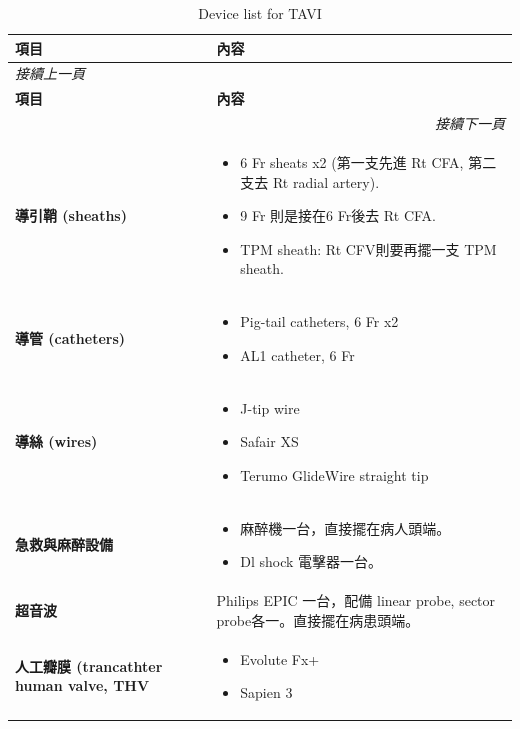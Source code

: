 \documentclass[nols]{tufte-book}
\begin{document}
\begin{longtable}{p{4cm} p{9cm}}
\caption{Device list for TAVI}\\
\hline
\textbf{項目} & \textbf{內容} \\
\hline
\endfirsthead
\multicolumn{2}{l}{\textit{接續上一頁}} \\
\hline
\textbf{項目} & \textbf{內容} \\
\hline
\endhead
\hline \multicolumn{2}{r}{\textit{接續下一頁}} \\
\endfoot
\endlastfoot

\textbf{導引鞘 (sheaths)} & 
\begin{itemize}
    \item 6 Fr sheats x2 (第一支先進 Rt CFA, 第二支去 Rt radial artery).
    \item 9 Fr 則是接在6 Fr後去 Rt CFA.
    \item TPM sheath: Rt CFV則要再擺一支 TPM sheath.
\end{itemize}
\\ \hline

\textbf{導管 (catheters)} & 
\begin{itemize}
    \item Pig-tail catheters, 6 Fr x2
    \item AL1 catheter, 6 Fr
\end{itemize}
\\ \hline

\textbf{導絲 (wires)} & 
\begin{itemize}
    \item J-tip wire
    \item Safair XS
    \item Terumo GlideWire straight tip
\end{itemize}
\\ \hline

\textbf{急救與麻醉設備} & 
\begin{itemize}
    \item 麻醉機一台，直接擺在病人頭端。
    \item Dl shock 電擊器一台。
\end{itemize}
\\ \hline

\textbf{超音波} & 
Philips EPIC 一台，配備 linear probe, sector probe各一。直接擺在病患頭端。
\\ \hline

\textbf{人工瓣膜 (trancathter human valve, THV} & 
\begin{itemize}
    \item Evolute Fx+
    \item Sapien 3
\end{itemize}
\\ \hline


\end{longtable}
\end{document}

